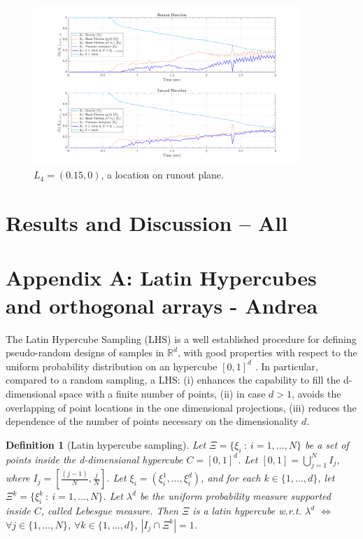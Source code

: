 \documentclass{article}
\newtheorem{definition}[theorem]{Definition}
\begin{document}
\begin{figure}[H]
\centering
	\includegraphics[width=0.9\textwidth]{InclinedPlane/LocalRecords/DominancePr_x4V.png}
	\caption{$L_4=(0.15,0)$, a location on runout plane.}
	\label{fig:Ramp-Prx4V}
\end{figure}

\section{Results and Discussion -- All}

\section*{Appendix A: Latin Hypercubes and orthogonal arrays - Andrea}
The Latin Hypercube Sampling (LHS) is a well established procedure for defining pseudo-random designs of samples in $\mathbb R^d$, with good properties with respect to the uniform probability distribution on an hypercube $[0,1]^d$ \citep{McKay1979,Stein1987,Ranjan2014,Mingyao2016}. In particular, compared to a random sampling, a LHS: (i) enhances the capability to fill the d-dimensional space with a finite number of points, (ii) in case $d>1$, avoids the overlapping of point locations in the one dimensional projections, (iii) reduces the dependence of the number of points necessary on the dimensionality $d$.

\begin{definition}[Latin hypercube sampling]
Let $\Xi=\{\xi_i\ :\ i=1,\dots,N\}$ be a set of points inside the d-dimensional hypercube $C=[0,1]^d$. Let $[0,1]=\bigcup_{j=1}^{N} I_j$, where $I_j=[\frac{(j-1)}{N},\frac{j}{N}]$. Let $\xi_i=\left(\xi_i^1,\dots,\xi_i^d\right)$, and for each $k\in\{1,\dots,d\}$, let $\Xi^k=\{\xi^k_i\ :\ i=1,\dots,N\}$. Let $\lambda^d$ be the uniform probability measure supported inside $C$, called Lebesgue measure. Then $\Xi$ is a latin hypercube w.r.t. $\lambda^d$ $\Longleftrightarrow$ $\forall j\in \{1,\dots,N\}$, $\forall k\in\{1,\dots,d\}$, $\left|I_j\cap\Xi^k\right|=1$.
\end{definition}
\end{document}
